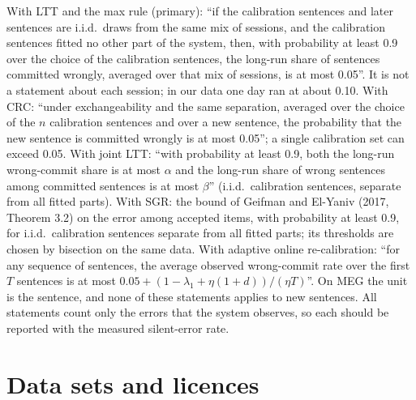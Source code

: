 With LTT and the max rule (primary): ``if the calibration sentences and later sentences are i.i.d.\ draws from the same mix of sessions, and the calibration sentences fitted no other part of the system, then, with probability at least 0.9 over the choice of the calibration sentences, the long-run share of sentences committed wrongly, averaged over that mix of sessions, is at most 0.05''. It is not a statement about each session; in our data one day ran at about 0.10. With CRC: ``under exchangeability and the same separation, averaged over the choice of the $n$ calibration sentences and over a new sentence, the probability that the new sentence is committed wrongly is at most 0.05''; a single calibration set can exceed 0.05. With joint LTT: ``with probability at least 0.9, both the long-run wrong-commit share is at most $\alpha$ and the long-run share of wrong sentences among committed sentences is at most $\beta$'' (i.i.d.\ calibration sentences, separate from all fitted parts). With SGR: the bound of Geifman and El-Yaniv (2017, Theorem 3.2) on the error among accepted items, with probability at least 0.9, for i.i.d.\ calibration sentences separate from all fitted parts; its thresholds are chosen by bisection on the same data. With adaptive online re-calibration: ``for any sequence of sentences, the average observed wrong-commit rate over the first $T$ sentences is at most $0.05 + (1 - \lambda_1 + \eta(1+d))/(\eta T)$''. On MEG the unit is the sentence, and none of these statements applies to new sentences. All statements count only the errors that the system observes, so each should be reported with the measured silent-error rate.

\section{Data sets and licences}
\label{app:licences}

